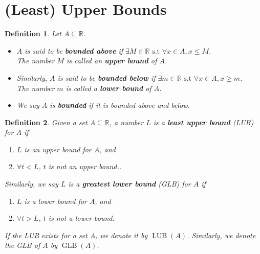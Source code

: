 \documentclass{article}
\theoremstyle{sltheorem}
\newtheorem{definition}{Definition}[section]
\newcommand{\R}{\mathbb{R}}
\newcommand{\st}{\text{ s.t }}
\DeclareMathOperator{\lub}{LUB}
\DeclareMathOperator{\glb}{GLB}
\newcommand*\B[1]{\textbf{#1}}
\begin{document}
\section{(Least) Upper Bounds}
\begin{definition}
    Let $A\subseteq\R$.
    \begin{itemize}
        \item $A$ is said to be \B{bounded above} if $\exists M\in\R\st\forall x\in A,x\leq M$.\\
        The number $M$ is called an \B{upper bound} of $A$.
        \item Similarly, $A$ is said to be \B{bounded below} if $\exists m\in\R\st\forall x\in A,x\geq m$.\\
        The number $m$ is called a \B{lower bound} of $A$.
        \item We say $A$ is \B{bounded} if it is bounded above and below.
    \end{itemize}
\end{definition}
\begin{definition}
    Given a set $A\subseteq\R$, a number $L$ is a \B{least upper bound} (LUB) for $A$ if
    \begin{enumerate}
        \item $L$ is an upper bound for $A$, and
        \item $\forall t<L$, $t$ is not an upper bound..
    \end{enumerate}
    Similarly, we say $L$ is a \B{greatest lower bound} (GLB) for $A$ if
    \begin{enumerate}
        \item $L$ is a lower bound for $A$, and
        \item $\forall t>L$, $t$ is not a lower bound.
    \end{enumerate}
    If the LUB exists for a set $A$, we denote it by $\lub(A)$. Similarly, we denote the GLB of $A$ by $\glb(A)$.
\end{definition}
\end{document}
